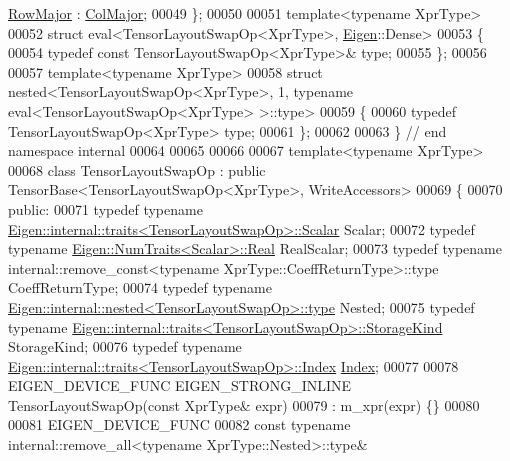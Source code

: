 \begin{DoxyCode}
      \hyperlink{group__enums_ggaacded1a18ae58b0f554751f6cdf9eb13acfcde9cd8677c5f7caf6bd603666aae3}{RowMajor} : \hyperlink{group__enums_ggaacded1a18ae58b0f554751f6cdf9eb13a0cbd4bdd0abcfc0224c5fcb5e4f6669a}{ColMajor};
00049 \};
00050 
00051 \textcolor{keyword}{template}<\textcolor{keyword}{typename} XprType>
00052 \textcolor{keyword}{struct }eval<TensorLayoutSwapOp<XprType>, \hyperlink{namespace_eigen}{Eigen}::Dense>
00053 \{
00054   \textcolor{keyword}{typedef} \textcolor{keyword}{const} TensorLayoutSwapOp<XprType>& type;
00055 \};
00056 
00057 \textcolor{keyword}{template}<\textcolor{keyword}{typename} XprType>
00058 \textcolor{keyword}{struct }nested<TensorLayoutSwapOp<XprType>, 1, typename eval<TensorLayoutSwapOp<XprType> >::type>
00059 \{
00060   \textcolor{keyword}{typedef} TensorLayoutSwapOp<XprType> type;
00061 \};
00062 
00063 \}  \textcolor{comment}{// end namespace internal}
00064 
00065 
00066 
00067 \textcolor{keyword}{template}<\textcolor{keyword}{typename} XprType>
00068 \textcolor{keyword}{class }TensorLayoutSwapOp : \textcolor{keyword}{public} TensorBase<TensorLayoutSwapOp<XprType>, WriteAccessors>
00069 \{
00070   \textcolor{keyword}{public}:
00071   \textcolor{keyword}{typedef} \textcolor{keyword}{typename} \hyperlink{struct_eigen_1_1internal_1_1traits}{Eigen::internal::traits<TensorLayoutSwapOp>::Scalar}
       Scalar;
00072   \textcolor{keyword}{typedef} \textcolor{keyword}{typename} \hyperlink{group___sparse_core___module}{Eigen::NumTraits<Scalar>::Real} RealScalar;
00073   \textcolor{keyword}{typedef} \textcolor{keyword}{typename} internal::remove\_const<typename XprType::CoeffReturnType>::type CoeffReturnType;
00074   \textcolor{keyword}{typedef} \textcolor{keyword}{typename} \hyperlink{class_eigen_1_1internal_1_1_tensor_lazy_evaluator_writable}{Eigen::internal::nested<TensorLayoutSwapOp>::type}
       Nested;
00075   \textcolor{keyword}{typedef} \textcolor{keyword}{typename} \hyperlink{struct_eigen_1_1internal_1_1traits}{Eigen::internal::traits<TensorLayoutSwapOp>::StorageKind}
       StorageKind;
00076   \textcolor{keyword}{typedef} \textcolor{keyword}{typename} \hyperlink{struct_eigen_1_1internal_1_1traits}{Eigen::internal::traits<TensorLayoutSwapOp>::Index}
       \hyperlink{namespace_eigen_a62e77e0933482dafde8fe197d9a2cfde}{Index};
00077 
00078   EIGEN\_DEVICE\_FUNC EIGEN\_STRONG\_INLINE TensorLayoutSwapOp(\textcolor{keyword}{const} XprType& expr)
00079       : m\_xpr(expr) \{\}
00080 
00081     EIGEN\_DEVICE\_FUNC
00082     \textcolor{keyword}{const} \textcolor{keyword}{typename} internal::remove\_all<typename XprType::Nested>::type&

\end{DoxyCode}

